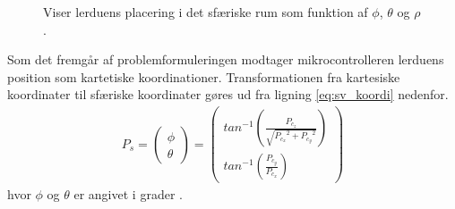 \begin{figure}[!th]
\centering
\begin{tikzpicture}[scale=4]

\end{tikzpicture}
\caption[Sfærisk koordinatsystem til koordinattransformation]{Viser lerduens placering i det sfæriske rum som funktion af  \(\phi\), \(\theta\) og \(\rho\).}
\label{fig:thetaphi_degree}
\end{figure}

Som det fremgår af problemformuleringen modtager mikrocontrolleren lerduens
position som kartetiske koordinationer.
Transformationen fra kartesiske koordinater til
sfæriske koordinater gøres ud fra ligning \ref{eq:sv_koordi} nedenfor.
\begin{align}
{ P }_{ s }=\left( \begin{matrix} \phi  \\ \theta  \end{matrix} \right) =\left( \begin{matrix} { tan }^{ -1 }\left( \frac { { P }_{ c_{ z } } }{ \sqrt { { { P }_{ c_{ x } } }^{ 2 }+{ { P }_{ c_{ y } } }^{ 2 } }  }  \right)  \\ { tan }^{ -1 }\left( \frac { { P }_{ c_{ y } } }{ { P }_{ c_{ x } } }  \right)  \end{matrix} \right) 
\label{eq:sv_koordi}
\end{align}
hvor \(\phi\) og \(\theta\) er angivet i grader \citep[Kap. 10.6]{adam}.
